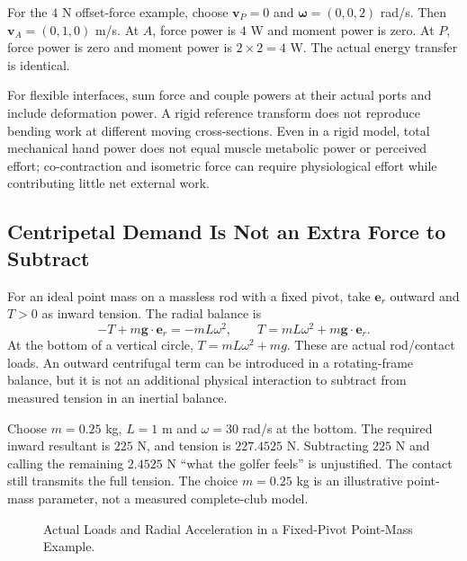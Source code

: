 \documentclass[11pt,a4paper]{article}
\newcommand{\vect}[1]{\boldsymbol{#1}}
\begin{document}
For the $4$ N offset-force example, choose $\vect v_P=0$ and $\vect\omega=(0,0,2)$ rad/s. Then $\vect v_A=(0,1,0)$ m/s. At $A$, force power is $4$ W and moment power is zero. At $P$, force power is zero and moment power is $2\times2=4$ W. The actual energy transfer is identical.

For flexible interfaces, sum force and couple powers at their actual ports and include deformation power. A rigid reference transform does not reproduce bending work at different moving cross-sections. Even in a rigid model, total mechanical hand power does not equal muscle metabolic power or perceived effort; co-contraction and isometric force can require physiological effort while contributing little net external work.

\subsection{Centripetal Demand Is Not an Extra Force to Subtract}
For an ideal point mass on a massless rod with a fixed pivot, take $\vect e_r$ outward and $T>0$ as inward tension. The radial balance is
\begin{equation}
-T+m\vect g\cdot\vect e_r=-mL\omega^2,
\qquad T=mL\omega^2+m\vect g\cdot\vect e_r.
\end{equation}
At the bottom of a vertical circle, $T=mL\omega^2+mg$. These are actual rod/contact loads. An outward centrifugal term can be introduced in a rotating-frame balance, but it is not an additional physical interaction to subtract from measured tension in an inertial balance.

Choose $m=0.25$ kg, $L=1$ m and $\omega=30$ rad/s at the bottom. The required inward resultant is $225$ N, and tension is $227.4525$ N. Subtracting $225$ N and calling the remaining $2.4525$ N ``what the golfer feels'' is unjustified. The contact still transmits the full tension. The choice $m=0.25$ kg is an illustrative point-mass parameter, not a measured complete-club model.

\begin{figure}[htbp]\centering
{}
\caption{Actual Loads and Radial Acceleration in a Fixed-Pivot Point-Mass Example.}
\end{figure}
\end{document}
